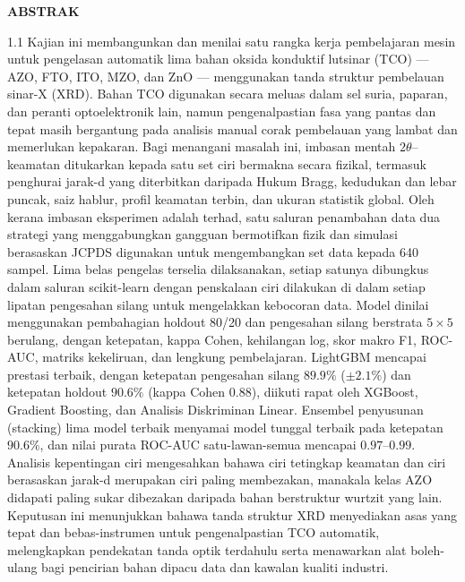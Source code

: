 \documentclass[12pt, oneside]{article} %
\begin{document}
\begin{center}
\vfill \null
{}
{}
\textbf{ABSTRAK}
\end{center}


\vspace{1cm}

\begin{spacing}{1.1}
Kajian ini membangunkan dan menilai satu rangka kerja pembelajaran mesin untuk pengelasan automatik lima bahan oksida konduktif lutsinar (TCO) --- AZO, FTO, ITO, MZO, dan ZnO --- menggunakan tanda struktur pembelauan sinar-X (XRD). Bahan TCO digunakan secara meluas dalam sel suria, paparan, dan peranti optoelektronik lain, namun pengenalpastian fasa yang pantas dan tepat masih bergantung pada analisis manual corak pembelauan yang lambat dan memerlukan kepakaran. Bagi menangani masalah ini, imbasan mentah $2\theta$--keamatan ditukarkan kepada satu set ciri bermakna secara fizikal, termasuk penghurai jarak-d yang diterbitkan daripada Hukum Bragg, kedudukan dan lebar puncak, saiz hablur, profil keamatan terbin, dan ukuran statistik global. Oleh kerana imbasan eksperimen adalah terhad, satu saluran penambahan data dua strategi yang menggabungkan gangguan bermotifkan fizik dan simulasi berasaskan JCPDS digunakan untuk mengembangkan set data kepada 640 sampel. Lima belas pengelas terselia dilaksanakan, setiap satunya dibungkus dalam saluran scikit-learn dengan penskalaan ciri dilakukan di dalam setiap lipatan pengesahan silang untuk mengelakkan kebocoran data. Model dinilai menggunakan pembahagian holdout 80/20 dan pengesahan silang berstrata $5 \times 5$ berulang, dengan ketepatan, kappa Cohen, kehilangan log, skor makro F1, ROC-AUC, matriks kekeliruan, dan lengkung pembelajaran. LightGBM mencapai prestasi terbaik, dengan ketepatan pengesahan silang $89.9\%$ ($\pm 2.1\%$) dan ketepatan holdout $90.6\%$ (kappa Cohen $0.88$), diikuti rapat oleh XGBoost, Gradient Boosting, dan Analisis Diskriminan Linear. Ensembel penyusunan (stacking) lima model terbaik menyamai model tunggal terbaik pada ketepatan $90.6\%$, dan nilai purata ROC-AUC satu-lawan-semua mencapai $0.97$--$0.99$. Analisis kepentingan ciri mengesahkan bahawa ciri tetingkap keamatan dan ciri berasaskan jarak-d merupakan ciri paling membezakan, manakala kelas AZO didapati paling sukar dibezakan daripada bahan berstruktur wurtzit yang lain. Keputusan ini menunjukkan bahawa tanda struktur XRD menyediakan asas yang tepat dan bebas-instrumen untuk pengenalpastian TCO automatik, melengkapkan pendekatan tanda optik terdahulu serta menawarkan alat boleh-ulang bagi pencirian bahan dipacu data dan kawalan kualiti industri.
\end{spacing}
\end{document}
